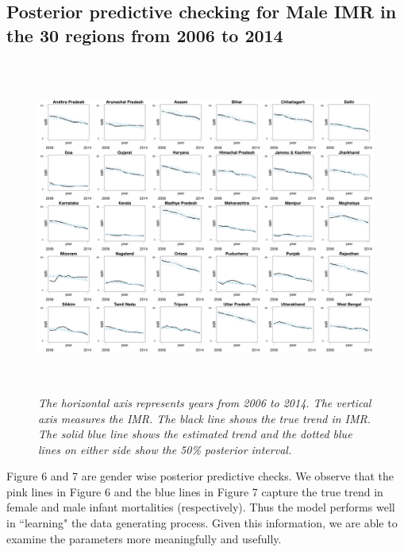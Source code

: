 \documentclass{article}
\begin{document}
\subsection{Posterior predictive checking for Male IMR in the 30 regions from 2006 to 2014}
\begin{figure}[H]
   \begin{center}
   \includegraphics[height = 11cm, width = 15cm]{mal_ppc.pdf}
   \end{center}
   \caption{\emph{The horizontal axis represents years from 2006 to 2014. The vertical axis measures the IMR. The black line shows the true trend in IMR. The solid blue line shows the estimated trend and the dotted blue lines on either side show the 50\% posterior interval.}}
\end{figure}

Figure 6 and 7 are gender wise posterior predictive checks. We observe that the pink lines in Figure 6 and the blue lines in Figure 7 capture the true trend in female and male infant mortalities (respectively). Thus the model performs well in ``learning" the data generating process. Given this information, we are able to examine the parameters more meaningfully and usefully.
\end{document}
